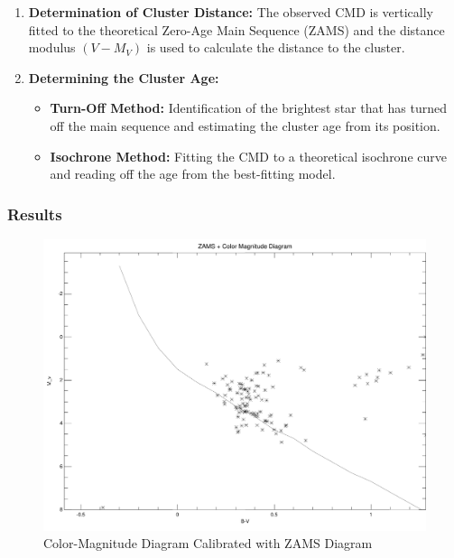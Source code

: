 \documentclass[12pt,a4paper]{article}
\begin{document}
\begin{enumerate}
    \item \textbf{Determination of Cluster Distance:} The observed CMD is vertically fitted to the theoretical Zero-Age Main Sequence (ZAMS) and the distance modulus $(V - M_V)$ is used to calculate the distance to the cluster.

    \item \textbf{Determining the Cluster Age:}
    \begin{itemize}
        \item \textbf{Turn-Off Method:} Identification of the brightest star that has turned off the main sequence and estimating the cluster age from its position.
        \item \textbf{Isochrone Method:} Fitting the CMD to a theoretical isochrone curve and reading off the age from the best-fitting model.
    \end{itemize}
\end{enumerate}

\subsubsection{Results}
\begin{figure}[H]
  \centering
  \includegraphics[width=1.0\textwidth]{Pictures/CMD_M37_2.pdf}
  \caption{Color-Magnitude Diagram Calibrated with ZAMS Diagram}
  \label{fig:CMD_ZAMS}
\end{figure}
\end{document}
